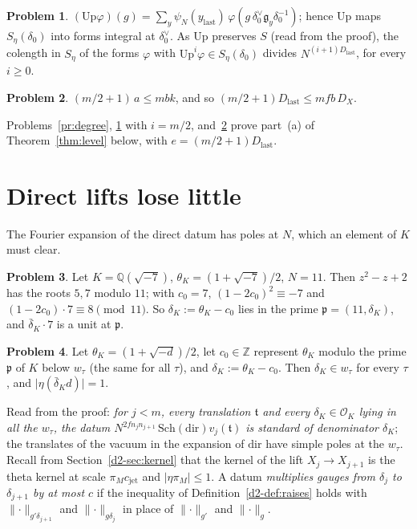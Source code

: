 \documentclass[reqno]{amsart}
\theoremstyle{plain}
\theoremstyle{definition}
\newtheorem{problem}{Problem}[section]
\theoremstyle{remark}
\newcommand{\Z}{{\mathbb{Z}}}
\newcommand{\Q}{{\mathbb{Q}}}
\newcommand{\Oc}{\mathcal O}
\newcommand{\Up}{\mathrm{Up}}
\newcommand{\Sch}{\mathrm{Sch}}
\newcommand{\dir}{\mathrm{dir}}
\newcommand{\Dl}{D_{\mathrm{last}}}
\newcommand{\cjet}{c_{\mathrm{jet}}}
\newcommand{\nb}[1]{\lVert #1 \rVert}
\begin{document}
\begin{problem}\label{pr:up-integral}
\((\Up\varphi)(g) = \sum_y\psi_N(y_{\mathrm{last}})\,\varphi(g\,\delta_0^\vee\mathfrak g_y\delta_0^{-1})\); hence \(\Up\) maps \(S_\eta(\delta_0)\) into forms integral at \(\delta_0^\vee\).  As \(\Up\) preserves \(S\) (read from the proof), the colength in \(S_\eta\) of the forms \(\varphi\) with \(\Up^i\varphi \in S_\eta(\delta_0)\) divides \(N^{(i+1)\Dl}\), for every \(i \ge 0\).
\end{problem}

\begin{problem}\label{pr:exponent}
\((m/2 + 1)\,a \le m b k\), and so \((m/2 + 1)\Dl \le mfb\,D_X\).
\end{problem}

Problems~\ref{pr:degree}, \ref{pr:up-integral} with \(i = m/2\), and~\ref{pr:exponent} prove part~(a) of Theorem~\ref{thm:level} below, with \(e = (m/2+1)\Dl\).

\section{Direct lifts lose little}\label{sec:direct}

The Fourier expansion of the direct datum has poles at \(N\), which an element of \(K\) must clear.

\begin{problem}\label{pr:sqrt-7}
Let \(K = \Q(\sqrt{-7})\), \(\theta_K = (1+\sqrt{-7})/2\), \(N = 11\).  Then \(z^2 - z + 2\) has the roots \(5, 7\) modulo \(11\); with \(c_0 = 7\), \((1 - 2c_0)^2 \equiv -7\) and \((1 - 2c_0)\cdot 7 \equiv 8 \pmod{11}\).  So \(\delta_K := \theta_K - c_0\) lies in the prime \(\mathfrak p = (11, \delta_K)\), and \(\bar{\delta}_K\cdot 7\) is a unit at \(\mathfrak p\).
\end{problem}

\begin{problem}\label{pr:delta}
Let \(\theta_K = (1 + \sqrt{-d})/2\), let \(c_0 \in \Z\) represent \(\theta_K\) modulo the prime \(\mathfrak p\) of \(K\) below \(w_\tau\) (the same for all \(\tau\)), and \(\delta_K := \theta_K - c_0\).  Then \(\delta_K \in w_\tau\) for every \(\tau\), and \(\lvert\eta(\bar{\delta}_K d)\rvert = 1\).
\end{problem}

Read from the proof: \emph{for \(j < m\), every translation \(\mathfrak t\) and every \(\delta_K \in \Oc_K\) lying in all the \(w_\tau\), the datum \(N^{2fn_jn_{j+1}}\,\Sch(\dir)v_j(\mathfrak t)\) is standard of denominator \(\delta_K\)}; the translates of the vacuum in the expansion of \(\dir\) have simple poles at the \(w_\tau\).  Recall from Section~\ref{d2-sec:kernel} that the kernel of the lift \(X_j \to X_{j+1}\) is the theta kernel at scale \(\pi_M\cjet\) and \(\lvert\eta\pi_M\rvert \le 1\).  A datum \emph{multiplies gauges from \(\delta_j\) to \(\delta_{j+1}\) by at most \(c\)} if the inequality of Definition~\ref{d2-def:raises} holds with \(\nb{\cdot}_{g'\delta_{j+1}}\) and \(\nb{\cdot}_{g\delta_j}\) in place of \(\nb{\cdot}_{g'}\) and \(\nb{\cdot}_g\).
\end{document}
